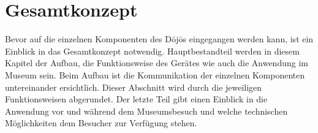 \section{Gesamtkonzept}\label{sec:gesamtkonzept}
Bevor auf die einzelnen Komponenten des Dōjōs eingegangen werden kann, ist ein Einblick in das Gesamtkonzept notwendig. Hauptbestandteil werden in diesem Kapitel der Aufbau, die Funktionsweise des Gerätes wie auch die Anwendung im Museum sein. Beim Aufbau ist die Kommunikation der einzelnen Komponenten untereinander ersichtlich. Dieser Abschnitt wird durch die jeweiligen Funktionsweisen abgerundet. Der letzte Teil gibt einen Einblick in die Anwendung vor und während dem Museumsbesuch und welche technischen Möglichkeiten dem Besucher zur Verfügung stehen.